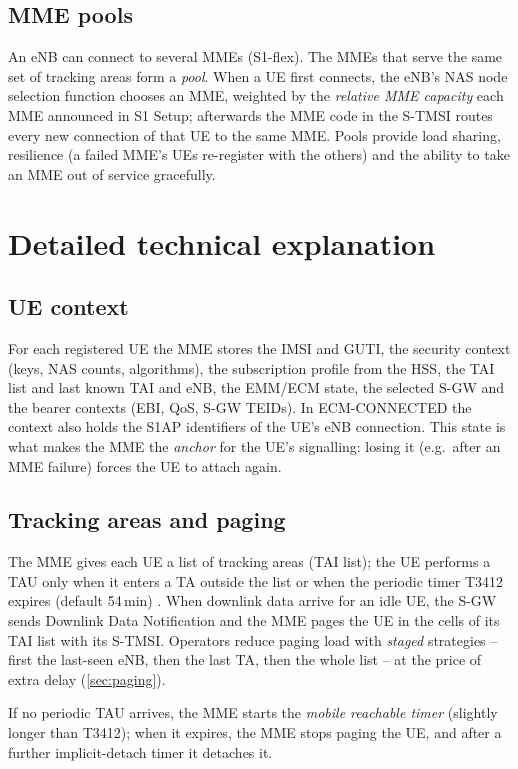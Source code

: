 \documentclass[11pt,a4paper]{article}
\begin{document}
\subsection{MME pools}
An eNB can connect to several MMEs (S1-flex). The MMEs that serve the same set of tracking areas form a
\emph{pool}. When a UE first connects, the eNB's NAS node selection function chooses an MME, weighted by
the \emph{relative MME capacity} each MME announced in S1 Setup; afterwards the MME code in the S-TMSI
routes every new connection of that UE to the same MME. Pools provide load sharing, resilience (a failed
MME's UEs re-register with the others) and the ability to take an MME out of service gracefully.

\section{Detailed technical explanation}

\subsection{UE context}
For each registered UE the MME stores the IMSI and GUTI, the security context (keys, NAS counts,
algorithms), the subscription profile from the HSS, the TAI list and last known TAI and eNB, the EMM/ECM
state, the selected S-GW and the bearer contexts (EBI, QoS, S-GW TEIDs). In ECM-CONNECTED the context
also holds the S1AP identifiers of the UE's eNB connection. This state is what makes the MME the
\emph{anchor} for the UE's signalling: losing it (e.g.\ after an MME failure) forces the UE to attach
again.

\subsection{Tracking areas and paging}
The MME gives each UE a list of tracking areas (TAI list); the UE performs a TAU only when it enters a
TA outside the list or when the periodic timer T3412 expires (default 54\,min) \cite{ts24301}. When
downlink data arrive for an idle UE, the S-GW sends Downlink Data Notification and the MME pages the UE
in the cells of its TAI list with its S-TMSI. Operators reduce paging load with \emph{staged} strategies
-- first the last-seen eNB, then the last TA, then the whole list -- at the price of extra delay
(\cref{sec:paging}).

If no periodic TAU arrives, the MME starts the \emph{mobile reachable timer} (slightly longer than T3412);
when it expires, the MME stops paging the UE, and after a further implicit-detach timer it detaches it.
\end{document}
